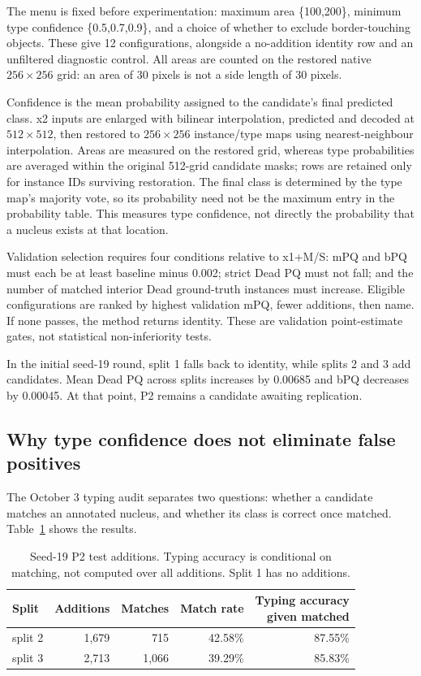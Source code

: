 \documentclass[11pt,a4paper]{article}
\begin{document}
The menu is fixed before experimentation: maximum area \{100,200\}, minimum type confidence \{0.5,0.7,0.9\}, and a choice of whether to exclude border-touching objects. These give 12 configurations, alongside a no-addition identity row and an unfiltered diagnostic control. All areas are counted on the restored native $256\times256$ grid: an area of 30 pixels is not a side length of 30 pixels.

Confidence is the mean probability assigned to the candidate's final predicted class. x2 inputs are enlarged with bilinear interpolation, predicted and decoded at $512\times512$, then restored to $256\times256$ instance/type maps using nearest-neighbour interpolation. Areas are measured on the restored grid, whereas type probabilities are averaged within the original 512-grid candidate masks; rows are retained only for instance IDs surviving restoration. The final class is determined by the type map's majority vote, so its probability need not be the maximum entry in the probability table. This measures type confidence, not directly the probability that a nucleus exists at that location.

Validation selection requires four conditions relative to x1+M/S: mPQ and bPQ must each be at least baseline minus 0.002; strict Dead PQ must not fall; and the number of matched interior Dead ground-truth instances must increase. Eligible configurations are ranked by highest validation mPQ, fewer additions, then name. If none passes, the method returns identity. These are validation point-estimate gates, not statistical non-inferiority tests.

In the initial seed-19 round, split 1 falls back to identity, while splits 2 and 3 add candidates. Mean Dead PQ across splits increases by 0.00685 and bPQ decreases by 0.00045. At that point, P2 remains a candidate awaiting replication.

\subsection{Why type confidence does not eliminate false positives}

The October 3 typing audit separates two questions: whether a candidate matches an annotated nucleus, and whether its class is correct once matched. Table~\ref{tab:typing} shows the results.

\begin{table}[H]
\centering\small
\caption{Seed-19 P2 test additions. Typing accuracy is conditional on matching, not computed over all additions. Split 1 has no additions.}
\label{tab:typing}
\begin{tabular}{lrrrr}\toprule
Split & Additions & Matches & Match rate & \shortstack{Typing accuracy\\given matched}\\\midrule
split 2 & 1,679 & 715 & 42.58\% & 87.55\%\\
split 3 & 2,713 & 1,066 & 39.29\% & 85.83\%\\\bottomrule
\end{tabular}
\end{table}
\end{document}
